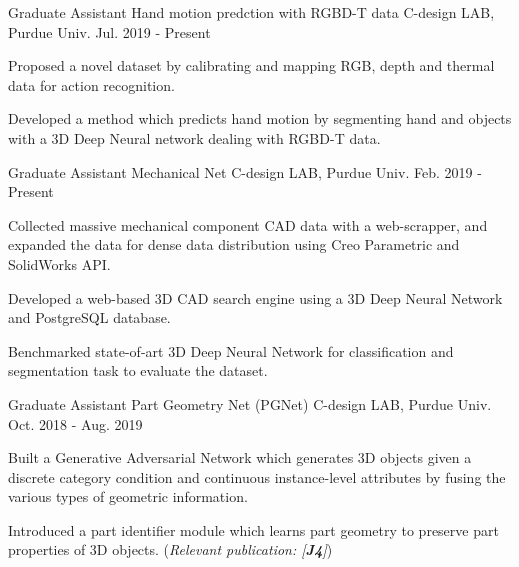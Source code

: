


\begin{cventries}
\cventry
{Graduate Assistant} %
{Hand motion predction with RGBD-T data} %
{C-design LAB, Purdue Univ.} %
{Jul. 2019 - Present} %
{ %
\begin{cvitems}
\item {Proposed a novel dataset by calibrating and mapping RGB, depth and thermal data for action recognition.}
\item {Developed a method which predicts hand motion by segmenting hand and objects with a 3D Deep Neural network dealing with RGBD-T data.}
\end{cvitems}
}


\cventry
{Graduate Assistant} %
{Mechanical Net} %
{C-design LAB, Purdue Univ.} %
{Feb. 2019 - Present} %
{ %
\begin{cvitems}
\item {Collected massive mechanical component CAD data with a web-scrapper, and expanded the data for dense data distribution using Creo Parametric and SolidWorks API.}
\item {Developed a web-based 3D CAD search engine using a 3D Deep Neural Network and PostgreSQL database.}
\item {Benchmarked state-of-art 3D Deep Neural Network for classification and segmentation task to evaluate the dataset.}
\end{cvitems}
}


\cventry
{Graduate Assistant} %
{Part Geometry Net (PGNet)} %
{C-design LAB, Purdue Univ.} %
{Oct. 2018 - Aug. 2019} %
{ %
\begin{cvitems}
\item {Built a Generative Adversarial Network which generates 3D objects given a discrete category condition and continuous instance-level attributes by fusing the various types of geometric information.}
\item {Introduced a part identifier module which learns part geometry to preserve part properties of 3D objects. (\textit{Relevant publication: [\textbf{J4}]})}
\end{cvitems}
}


\end{cventries}

